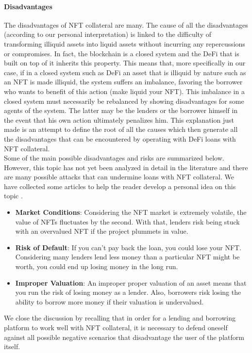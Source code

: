 \paragraph{Disadvantages} 
The disadvantages of NFT collateral are many. The cause of all the disadvantages (according to our personal interpretation) is linked to the difficulty of transforming illiquid assets into liquid assets without incurring any repercussions or compromises. In fact, the blockchain is a closed system and the DeFi that is built on top of it inherits this property. This means that, more specifically in our case, if in a closed system such as DeFi an asset that is illiquid by nature such as an NFT is made illiquid, the system suffers an imbalance, favoring the borrower who wants to benefit of this action (make liquid your NFT). This imbalance in a closed system must necessarily be rebalanced by showing disadvantages for some agents of the system. The latter may be the lenders or the borrower himself in the event that his own action ultimately penalizes him. This explanation just made is an attempt to define the root of all the causes which then generate all the disadvantages that can be encountered by operating with DeFi loans with NFT collateral. 
\\
\indent Some of the main possible disadvantages and risks are summarized below. However, this topic has not yet been analyzed in detail in the literature and there are many possible attacks that can undermine loans with NFT collateral. We have collected some articles to help the reader develop a personal idea on this topic \cite{art1}\cite{art2}\cite{art3}\cite{art4}. 
\begin{itemize}
    \item \textbf{Market Conditions}: Considering the NFT market is extremely volatile, the value of NFTs fluctuates by the second. With that, lenders risk being stuck with an overvalued NFT if the project plummets in value.
    \item \textbf{Risk of Default}: If you can’t pay back the loan, you could lose your NFT. Considering many lenders lend less money than a particular NFT might be worth, you could end up losing money in the long run.
    \item \textbf{Improper Valuation}: An improper proper valuation of an asset means that you run the risk of losing money as a lender. Also, borrowers risk losing the ability to borrow more money if their valuation is undervalued.
\end{itemize}
We close the discussion by recalling that in order for a lending and borrowing platform to work well with NFT collateral, it is necessary to defend oneself against all possible negative scenarios that disadvantage the user of the platform itself. 

